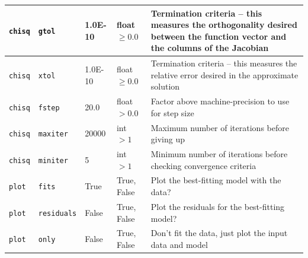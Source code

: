 \begin{center}
\begin{longtable}{p{1.5cm}p{2.5cm}p{2.0cm}p{2.0cm}p{5.0cm}}
\multicolumn{1}{p{1.5cm}}{\texttt{chisq}} &
\multicolumn{1}{p{2.5cm}}{\texttt{gtol}} &
\multicolumn{1}{p{2.0cm}}{1.0E-10} &
\multicolumn{1}{p{2.0cm}}{float $\ge0.0$} &
\multicolumn{1}{p{5.0cm}}{Termination criteria -- this measures the orthogonality desired between the function vector and the columns of the Jacobian} \\ \midrule

\multicolumn{1}{p{1.5cm}}{\texttt{chisq}} &
\multicolumn{1}{p{2.5cm}}{\texttt{xtol}} &
\multicolumn{1}{p{2.0cm}}{1.0E-10} &
\multicolumn{1}{p{2.0cm}}{float $\ge0.0$} &
\multicolumn{1}{p{5.0cm}}{Termination criteria -- this measures the relative error desired in the approximate solution} \\ \midrule

\multicolumn{1}{p{1.5cm}}{\texttt{chisq}} &
\multicolumn{1}{p{2.5cm}}{\texttt{fstep}} &
\multicolumn{1}{p{2.0cm}}{20.0} &
\multicolumn{1}{p{2.0cm}}{float $>0.0$} &
\multicolumn{1}{p{5.0cm}}{Factor above machine-precision to use for step size} \\ \midrule

\multicolumn{1}{p{1.5cm}}{\texttt{chisq}} &
\multicolumn{1}{p{2.5cm}}{\texttt{maxiter}} &
\multicolumn{1}{p{2.0cm}}{20000} &
\multicolumn{1}{p{2.0cm}}{int $>1$} &
\multicolumn{1}{p{5.0cm}}{Maximum number of iterations before giving up} \\ \midrule

\multicolumn{1}{p{1.5cm}}{\texttt{chisq}} &
\multicolumn{1}{p{2.5cm}}{\texttt{miniter}} &
\multicolumn{1}{p{2.0cm}}{5} &
\multicolumn{1}{p{2.0cm}}{int $>1$} &
\multicolumn{1}{p{5.0cm}}{Minimum number of iterations before checking convergence criteria} \\ \midrule

\multicolumn{1}{p{1.5cm}}{\texttt{plot}} &
\multicolumn{1}{p{2.5cm}}{\texttt{fits}} &
\multicolumn{1}{p{2.0cm}}{True} &
\multicolumn{1}{p{2.0cm}}{True, False} &
\multicolumn{1}{p{5.0cm}}{Plot the best-fitting model with the data?} \\ \midrule

\multicolumn{1}{p{1.5cm}}{\texttt{plot}} &
\multicolumn{1}{p{2.5cm}}{\texttt{residuals}} &
\multicolumn{1}{p{2.0cm}}{False} &
\multicolumn{1}{p{2.0cm}}{True, False} &
\multicolumn{1}{p{5.0cm}}{Plot the residuals for the best-fitting model?} \\ \midrule

\multicolumn{1}{p{1.5cm}}{\texttt{plot}} &
\multicolumn{1}{p{2.5cm}}{\texttt{only}} &
\multicolumn{1}{p{2.0cm}}{False} &
\multicolumn{1}{p{2.0cm}}{True, False} &
\multicolumn{1}{p{5.0cm}}{Don't fit the data, just plot the input data and model} \\ \midrule


\end{longtable}
\end{center}
